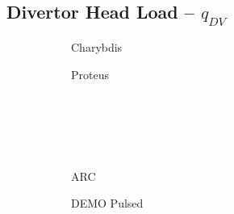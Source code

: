 \clearpage

\newpage

\subsection*{ Divertor Head Load -- $q_{DV}$ }
  \label{subsection:scan_q_DV}

\begin{figure*}[h!]
    \centering
    \hfill
    \begin{subfigure}[t]{0.45\textwidth}
        \centering
    \begin{adjustbox}{width=\textwidth}
      \Large
      
    \end{adjustbox}
        \caption{Charybdis}
    \end{subfigure}
    \hfill
    \begin{subfigure}[t]{0.45\textwidth}
        \centering
    \begin{adjustbox}{width=\textwidth}
      \Large
      
    \end{adjustbox}
        \caption{Proteus}
    \end{subfigure}
    \hfill \hfill ~\\ ~\\ ~\\ ~\\
    \hfill
    \begin{subfigure}[t]{0.45\textwidth}
        \centering
    \begin{adjustbox}{width=\textwidth}
      \Large
      
    \end{adjustbox}
        \caption{ARC}
    \end{subfigure}
    \hfill
    \begin{subfigure}[t]{0.45\textwidth}
        \centering
    \begin{adjustbox}{width=\textwidth}
      \Large
      
    \end{adjustbox}
        \caption{DEMO Pulsed}
    \end{subfigure}
    \hfill \hfill ~\\ ~\\ ~\\ ~\\
    \hfill
    \begin{subfigure}[t]{0.45\textwidth}
        \centering
    \begin{adjustbox}{width=\textwidth}

\end{adjustbox}
\end{subfigure}
\end{figure*}

